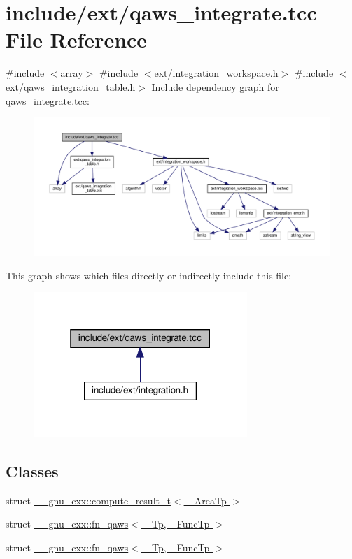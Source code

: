 \hypertarget{qaws__integrate_8tcc}{}\section{include/ext/qaws\+\_\+integrate.tcc File Reference}
\label{qaws__integrate_8tcc}
{\ttfamily \#include $<$array$>$}\newline
{\ttfamily \#include $<$ext/integration\+\_\+workspace.\+h$>$}\newline
{\ttfamily \#include $<$ext/qaws\+\_\+integration\+\_\+table.\+h$>$}\newline
Include dependency graph for qaws\+\_\+integrate.\+tcc\+:
\nopagebreak
\begin{figure}[H]
\begin{center}
\leavevmode
\includegraphics[width=350pt]{qaws__integrate_8tcc__incl}
\end{center}
\end{figure}
This graph shows which files directly or indirectly include this file\+:
\nopagebreak
\begin{figure}[H]
\begin{center}
\leavevmode
\includegraphics[width=229pt]{qaws__integrate_8tcc__dep__incl}
\end{center}
\end{figure}
\subsection*{Classes}
\begin{DoxyCompactItemize}
\item 
struct \hyperlink{struct____gnu__cxx_1_1compute__result__t}{\+\_\+\+\_\+gnu\+\_\+cxx\+::compute\+\_\+result\+\_\+t$<$ \+\_\+\+Area\+Tp $>$}
\item 
struct \hyperlink{struct____gnu__cxx_1_1fn__qaws}{\+\_\+\+\_\+gnu\+\_\+cxx\+::fn\+\_\+qaws$<$ \+\_\+\+Tp, \+\_\+\+Func\+Tp $>$}
\item 
struct \hyperlink{struct____gnu__cxx_1_1fn__qaws}{\+\_\+\+\_\+gnu\+\_\+cxx\+::fn\+\_\+qaws$<$ \+\_\+\+Tp, \+\_\+\+Func\+Tp $>$}
\end{DoxyCompactItemize}
